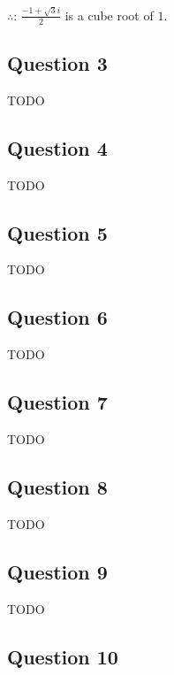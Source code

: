 \documentclass[12pt, letterpaper, oneside]{book}
\begin{document}
$\therefore$: $\frac{-1 + \sqrt{3}i}{2}$ is a cube root of $1$.

\subsection{Question 3}

TODO

\subsection{Question 4}

TODO

\subsection{Question 5}

TODO

\subsection{Question 6}

TODO

\subsection{Question 7}

TODO

\subsection{Question 8}

TODO

\subsection{Question 9}

TODO

\subsection{Question 10}
\end{document}
